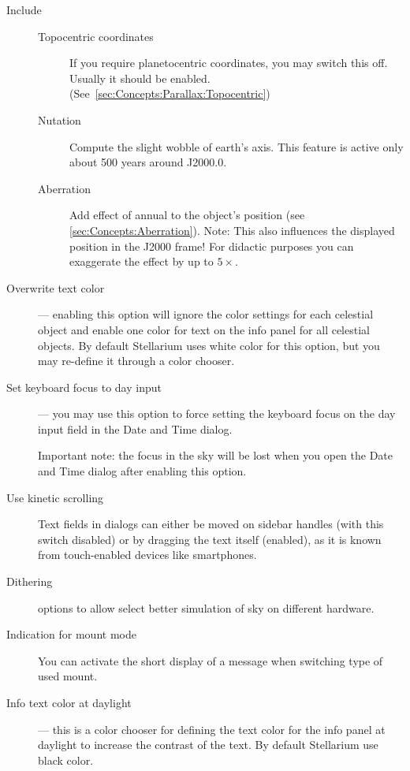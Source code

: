 \begin{description}
\item[Include]
\begin{description}
\item[Topocentric coordinates] If you require planetocentric coordinates, you may switch this off. 
  Usually it should be enabled. (See~\ref{sec:Concepts:Parallax:Topocentric})
\item[Nutation] Compute the slight wobble of earth's
  axis. This feature is active only about 500 years around J2000.0.
\item[Aberration] Add effect of annual  to the object's position (see \ref{sec:Concepts:Aberration}). 
     Note: This also influences the displayed position in the J2000 frame!
	 For didactic purposes you can exaggerate the effect by up to $5\times$. 
\end{description}

\item[Overwrite text color] --- enabling this option will ignore the 
  color settings for each celestial object and enable one color for text on the info panel 
  for all celestial objects. By default Stellarium uses white color for this option, 
  but you may re-define it through a color chooser.
\item[Set keyboard focus to day input] --- you may use this option to force setting the 
  keyboard focus on the day input field in the Date and Time dialog. 
  
  Important note: the focus in the sky will be lost when you open the 
  Date and Time dialog after enabling this option.

\item[Use kinetic scrolling]  Text fields in  
dialogs can either be moved on sidebar handles (with this switch
disabled) or by dragging the text itself (enabled), as it is known
from touch-enabled devices like smartphones. 
\item[Dithering] options to allow select better simulation of sky on different hardware.
\item[Indication for mount mode] You can activate the short display of a message when switching type of used mount.
\item[Info text color at daylight] --- this is a color chooser for defining the 
  text color for the info panel at daylight to increase the contrast of the text. 
  By default Stellarium use black color.
\end{description}

